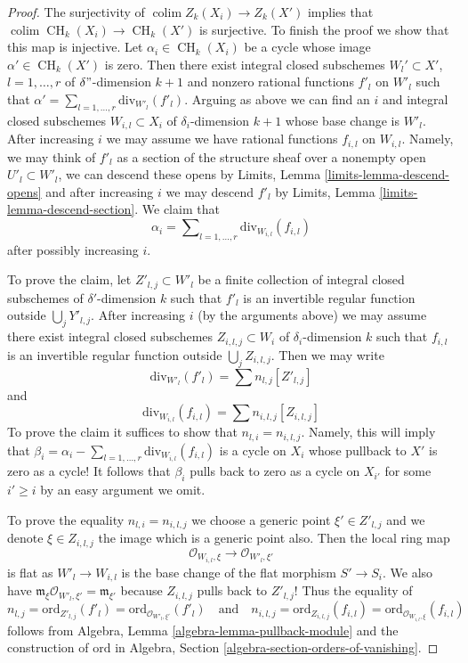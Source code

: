 \documentclass[10pt,a4paper]{amsart}
\theoremstyle{plain}
\theoremstyle{definition}
\theoremstyle{remark}
\numberwithin{equation}{subsection}
\def\colim{\mathop{\mathrm{colim}}\nolimits}
\def\CH{\mathop{\mathrm{CH}}\nolimits}
\begin{document}
\begin{proof}
\medskip\noindent
The surjectivity of $\colim Z_k(X_i) \to Z_k(X')$ implies that
$\colim \CH_k(X_i) \to \CH_k(X')$ is surjective.
To finish the proof we show that this map is injective.
Let $\alpha_i \in \CH_k(X_i)$
be a cycle whose image $\alpha' \in \CH_k(X')$ is zero.
Then there exist integral closed subschemes
$W_l' \subset X'$, $l = 1, \ldots, r$ of $\delta"$-dimension $k + 1$
and nonzero rational functions $f'_l$ on $W'_l$
such that $\alpha' = \sum_{l = 1, \ldots, r} \text{div}_{W'_l}(f'_l)$.
Arguing as above we can find an $i$ and integral closed subschemes
$W_{i, l} \subset X_i$ of $\delta_i$-dimension $k + 1$
whose base change is $W'_l$.
After increasing $i$ we may assume we have rational functions
$f_{i, l}$ on $W_{i, l}$. Namely, we may think of $f'_l$ as a
section of the structure sheaf over a nonempty open $U'_l \subset W'_l$,
we can descend these opens by Limits, Lemma \ref{limits-lemma-descend-opens}
and after increasing $i$ we may descend $f'_l$ by
Limits, Lemma \ref{limits-lemma-descend-section}.
We claim that
$$
\alpha_i = \sum\nolimits_{l = 1, \ldots, r} \text{div}_{W_{i, l}}(f_{i, l})
$$
after possibly increasing $i$.

\medskip\noindent
To prove the claim, let $Z'_{l, j} \subset W'_l$ be a finite
collection of integral closed subschemes of $\delta'$-dimension $k$
such that $f'_l$ is an invertible regular function outside
$\bigcup_j Y'_{l, j}$. After increasing $i$ (by the arguments above)
we may assume there exist integral closed subschemes $Z_{i, l, j} \subset W_i$
of $\delta_i$-dimension $k$ such that $f_{i, l}$ is an
invertible regular function outside $\bigcup_j Z_{i, l, j}$.
Then we may write
$$
\text{div}_{W'_l}(f'_l) = \sum n_{l, j} [Z'_{l, j}]
$$
and
$$
\text{div}_{W_{i, l}}(f_{i, l}) = \sum n_{i, l, j} [Z_{i, l, j}]
$$
To prove the claim it suffices to show that $n_{l, i} = n_{i, l, j}$.
Namely, this will imply that $\beta_i =
\alpha_i - \sum\nolimits_{l = 1, \ldots, r} \text{div}_{W_{i, l}}(f_{i, l})$
is a cycle on $X_i$ whose pullback to $X'$ is zero as a cycle!
It follows that $\beta_i$ pulls back to zero as a cycle on $X_{i'}$
for some $i' \geq i$ by an easy argument we omit.

\medskip\noindent
To prove the equality $n_{l, i} = n_{i, l, j}$ we choose a
generic point $\xi' \in Z'_{l, j}$ and we denote
$\xi \in Z_{i, l, j}$ the image which is a generic point also.
Then the local ring map
$$
\mathcal{O}_{W_{i, l}, \xi}
\longrightarrow
\mathcal{O}_{W'_l, \xi'}
$$
is flat as $W'_l \to W_{i, l}$ is the base change of the flat
morphism $S' \to S_i$. We also have
$\mathfrak m_\xi \mathcal{O}_{W'_l, \xi'} = \mathfrak m_{\xi'}$
because $Z_{i, l, j}$ pulls back to $Z'_{l, j}$! Thus the equality of
$$
n_{l, j} = \text{ord}_{Z'_{l, j}}(f'_l) =
\text{ord}_{\mathcal{O}_{W'_l, \xi'}}(f'_l)
\quad\text{and}\quad
n_{i, l, j} = \text{ord}_{Z_{i, l, j}}(f_{i, l}) =
\text{ord}_{\mathcal{O}_{W_{i, l}, \xi}}(f_{i, l})
$$
follows from Algebra, Lemma \ref{algebra-lemma-pullback-module}
and the construction of $\text{ord}$ in
Algebra, Section \ref{algebra-section-orders-of-vanishing}.
\end{proof}
\end{document}
